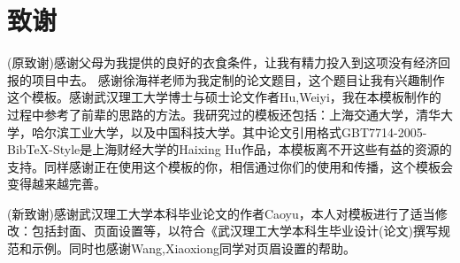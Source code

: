 \section*{致谢}
(原致谢)感谢父母为我提供的良好的衣食条件，让我有精力投入到这项没有经济回报的项目中去。
感谢徐海祥老师为我定制的论文题目，这个题目让我有兴趣制作这个模板。感谢武汉理工大学博士与硕士论文作者Hu,Weiyi，我在本模板制作的过程中参考了前辈的思路的方法。我研究过的模板还包括：上海交通大学，清华大学，哈尔滨工业大学，以及中国科技大学。其中论文引用格式GBT7714-2005-BibTeX-Style是上海财经大学的Haixing Hu作品，本模板离不开这些有益的资源的支持。同样感谢正在使用这个模板的你，相信通过你们的使用和传播，这个模板会变得越来越完善。


(新致谢)感谢武汉理工大学本科毕业论文的作者Caoyu，本人对模板进行了适当修改：包括封面、页面设置等，以符合《武汉理工大学本科生毕业设计(论文)撰写规范和示例。同时也感谢Wang,Xiaoxiong同学对页眉设置的帮助。